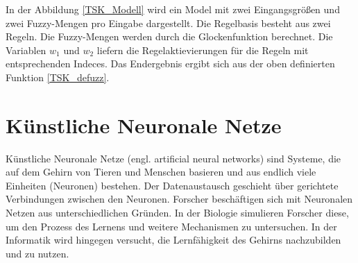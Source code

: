 In der Abbildung \ref{TSK_Modell} wird ein Model mit zwei Eingangsgrößen und zwei Fuzzy-Mengen pro Eingabe dargestellt. Die Regelbasis besteht aus zwei Regeln. Die Fuzzy-Mengen werden durch die Glockenfunktion berechnet. Die Variablen $w_1$ und $w_2$ liefern die Regelaktievierungen für die Regeln mit entsprechenden Indeces. Das Endergebnis ergibt sich aus der oben definierten Funktion \ref{TSK_defuzz}.


%











\section{Künstliche Neuronale Netze} \label{ANN}

Künstliche Neuronale Netze (engl. artificial neural networks) sind Systeme, die auf dem Gehirn von Tieren und Menschen basieren und aus endlich viele Einheiten (Neuronen) bestehen. Der Datenaustausch geschieht über gerichtete Verbindungen zwischen den Neuronen. Forscher beschäftigen sich mit Neuronalen Netzen aus unterschiedlichen Gründen. In der Biologie simulieren Forscher diese, um den Prozess des Lernens und weitere Mechanismen zu untersuchen. In der Informatik wird hingegen versucht, die Lernfähigkeit des Gehirns nachzubilden und zu nutzen.


